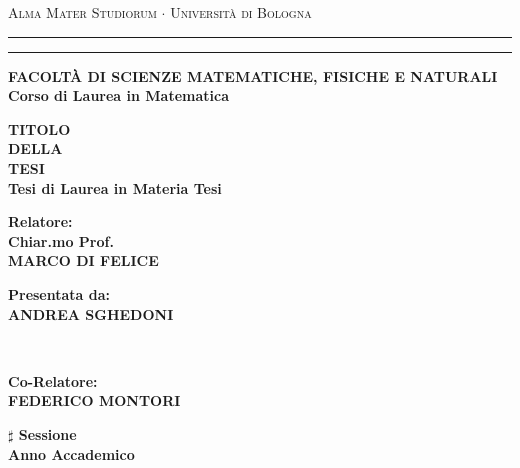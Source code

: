 \documentclass[12pt,a4paper]{report}
\begin{document}
\begin{titlepage}
\begin{center}
{{\Large{\textsc{Alma Mater Studiorum $\cdot$ Universit\`a di
Bologna}}}} \rule[0.1cm]{15.8cm}{0.1mm}
\rule[0.5cm]{15.8cm}{0.6mm}
{\small{\bf FACOLT\`A DI SCIENZE MATEMATICHE, FISICHE E NATURALI\\
Corso di Laurea in Matematica}}
\end{center}
\vspace{15mm}
\begin{center}
{\LARGE{\bf TITOLO}}\\
\vspace{3mm}
{\LARGE{\bf DELLA}}\\
\vspace{3mm}
{\LARGE{\bf TESI}}\\
\vspace{19mm} {\large{\bf Tesi di Laurea in Materia Tesi}}
\end{center}
\vspace{40mm}
\par
\noindent
\begin{minipage}[t]{0.47\textwidth}
{\large{\bf Relatore:\\
Chiar.mo Prof.\\
MARCO DI FELICE}}
\end{minipage}
\hfill
\begin{minipage}[t]{0.47\textwidth}\raggedleft
{\large{\bf Presentata da:\\
ANDREA SGHEDONI}}
\end{minipage}
\vspace{20mm}
\\\begin{minipage}[t]{0.47\textwidth}
{\large{\bf Co-Relatore:\\
FEDERICO MONTORI}}
\end{minipage}
\begin{center}
{\large{\bf $\sharp$ Sessione\\
Anno Accademico }}
\end{center}
\end{titlepage}
\end{document}
